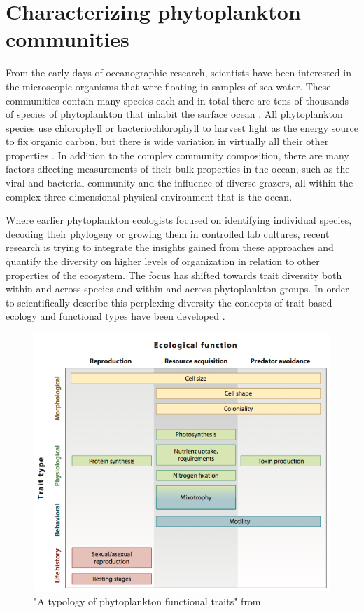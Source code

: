 \section{Characterizing phytoplankton communities}
From the early days of oceanographic research, scientists have been interested in the microscopic organisms that were floating in samples of sea water. These communities contain many species each and in total there are tens of thousands of species of phytoplankton that inhabit the surface ocean \citep{DeVargas2015}. All phytoplankton species use chlorophyll or bacteriochlorophyll to harvest light as the energy source to fix organic carbon, but there is wide variation in virtually all their other properties \citep{Litchman2008}. In addition to the complex community composition, there are many factors affecting measurements of their bulk properties in the ocean, such as the viral and bacterial community and the influence of diverse grazers, all within the complex three-dimensional physical environment that is the ocean. 

Where earlier phytoplankton ecologists focused on identifying individual species, decoding their phylogeny or growing them in controlled lab cultures, recent research is trying to integrate the insights gained from these approaches and quantify the diversity on higher levels of organization in relation to other properties of the ecosystem. The focus has shifted towards trait diversity both within and across species and within and across phytoplankton groups. In order to scientifically describe this perplexing diversity the concepts of trait-based ecology and functional types have been developed \citep{Tilman2001,McGill2006,Violle2007c}.

\begin{figure}
\centering
\includegraphics[width=0.7\linewidth]{./Chp1-Intro/Fig_litchman2008.png}
\caption[Scheme]{\small{"A typology of phytoplankton functional traits" from \cite{Litchman2008}}}
\label{PhytoTraits}
\end{figure}


